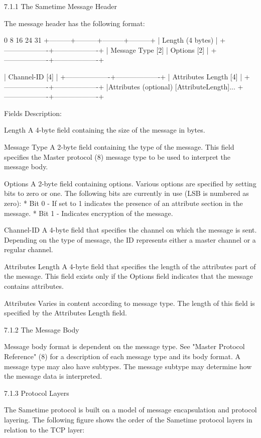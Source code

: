 \documentclass[titlepage,oneside]{book}
\begin{document}
7.1.1 The Sametime Message Header

The message header has the following format:

0         8         16        24      31
+---------+---------+---------+---------+
|            Length (4 bytes)           |
+-------------------+-------------------+
| Message Type [2]  |   Options [2]     |
+-------------------+-------------------+

|              Channel-ID [4]           |
+-------------------+-------------------+
|        Attributes Length [4]          |
+-------------------+-------------------+
|Attributes (optional) [AttributeLength]...
+-------------------+-------------------+

Fields Description:

Length
  A 4-byte field containing the size of the message in bytes.

Message Type
  A 2-byte field containing the type of the message. This field
  specifies the Master protocol (8) message type to be
  used to interpret the message body.

Options
  A 2-byte field containing options. Various options are specified
  by setting bits to zero or one. The following bits are currently in
  use (LSB is numbered as zero):
    * Bit 0 - If set to 1 indicates the presence of an attribute
      section in the message.
    * Bit 1 - Indicates encryption of the message.

Channel-ID
  A 4-byte field that specifies the channel on which the message is
  sent. Depending on the type of message, the ID represents either a
  master channel or a regular channel.

Attributes Length
  A 4-byte field that specifies the length of the attributes part of
  the message. This field exists only if the Options field indicates
  that the message contains attributes.

Attributes
  Varies in content according to message type. The length of this
  field is specified by the Attributes Length field.


7.1.2 The Message Body

Message body format is dependent on the message type. See "Master
Protocol Reference" (8) for a description of each message
type and its body format. A message type may also have subtypes. The
message subtype may determine how the message data is interpreted.

7.1.3 Protocol Layers

The Sametime protocol is built on a model of message encapsulation and
protocol layering. The following figure shows the order of the Sametime
protocol layers in relation to the TCP layer:
\end{document}
